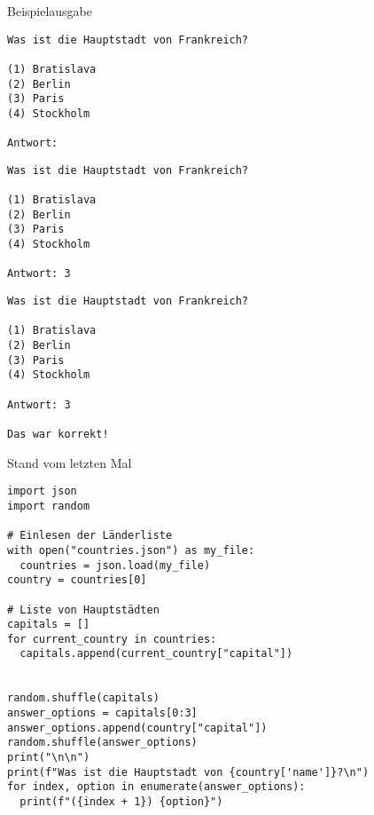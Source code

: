 \begin{fragile}
	
\begin{exampleblock}{Beispielausgabe}
\vspace{2pt}
\begin{overprint}
\begin{verbatim}
Was ist die Hauptstadt von Frankreich?

(1) Bratislava
(2) Berlin
(3) Paris
(4) Stockholm
 
Antwort: 
\end{verbatim}
\begin{verbatim}
Was ist die Hauptstadt von Frankreich?

(1) Bratislava
(2) Berlin
(3) Paris
(4) Stockholm

Antwort: 3
\end{verbatim}
\begin{verbatim}
Was ist die Hauptstadt von Frankreich?

(1) Bratislava
(2) Berlin
(3) Paris
(4) Stockholm

Antwort: 3

Das war korrekt!
\end{verbatim}
\end{overprint}
\end{exampleblock}
	
\end{fragile}

\begin{fragile}

\begin{block}{Stand vom letzten Mal}
\begin{verbatim}
import json
import random

# Einlesen der Länderliste
with open("countries.json") as my_file:
  countries = json.load(my_file)
country = countries[0]

# Liste von Hauptstädten
capitals = []
for current_country in countries:
  capitals.append(current_country["capital"])


random.shuffle(capitals)
answer_options = capitals[0:3]
answer_options.append(country["capital"])
random.shuffle(answer_options)
print("\n\n")
print(f"Was ist die Hauptstadt von {country['name']}?\n")
for index, option in enumerate(answer_options):
  print(f"({index + 1}) {option}")
\end{verbatim}
\end{block}
	
\end{fragile}


